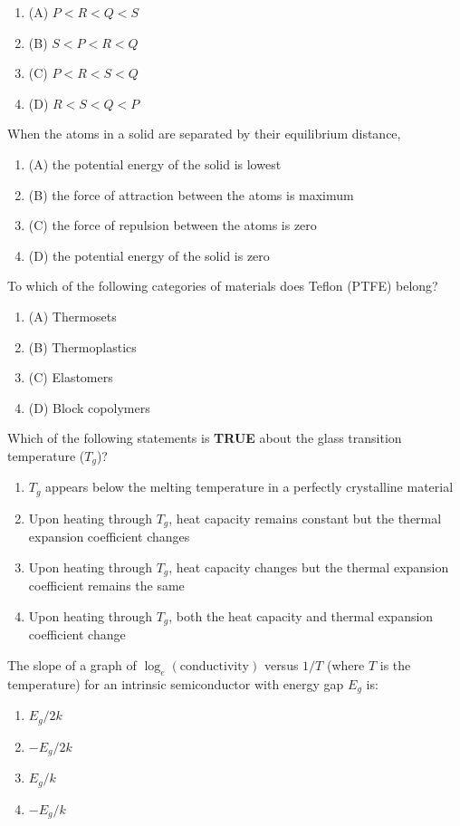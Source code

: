 \begin{enumerate}
    \item (A) $P < R < Q < S$
    \item (B) $S < P < R < Q$
    \item (C) $P < R < S < Q$
    \item (D) $R < S < Q < P$
\end{enumerate}
\item When the atoms in a solid are separated by their equilibrium distance,
\begin{enumerate}
    \item (A) the potential energy of the solid is lowest
    \item (B) the force of attraction between the atoms is maximum
    \item (C) the force of repulsion between the atoms is zero
    \item (D) the potential energy of the solid is zero
\end{enumerate}
\item To which of the following categories of materials does Teflon (PTFE) belong?
\begin{enumerate}
    \item (A) Thermosets
    \item (B) Thermoplastics
    \item (C) Elastomers
    \item (D) Block copolymers
\end{enumerate}

\item Which of the following statements is \textbf{TRUE} about the glass transition temperature ($T_g$)?
    \begin{enumerate}
        \item $T_g$ appears below the melting temperature in a perfectly crystalline material
        \item Upon heating through $T_g$, heat capacity remains constant but the thermal expansion coefficient changes
        \item Upon heating through $T_g$, heat capacity changes but the thermal expansion coefficient remains the same
        \item Upon heating through $T_g$, both the heat capacity and thermal expansion coefficient change
    \end{enumerate}
   
\item The slope of a graph of $\log_e(\text{conductivity})$ versus $1/T$ (where $T$ is the temperature) for an intrinsic semiconductor with energy gap $E_g$ is:
    \begin{enumerate}
        \item $E_g / 2k$
        \item $-E_g / 2k$
        \item $E_g / k$
        \item $-E_g / k$
    \end{enumerate}
   
